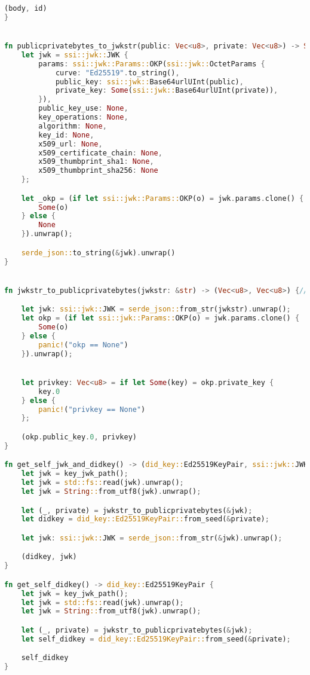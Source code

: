 \begin{lstlisting}[language=Rust]
    (body, id)
}


fn publicprivatebytes_to_jwkstr(public: Vec<u8>, private: Vec<u8>) -> String {
    let jwk = ssi::jwk::JWK {
        params: ssi::jwk::Params::OKP(ssi::jwk::OctetParams {
            curve: "Ed25519".to_string(),
            public_key: ssi::jwk::Base64urlUInt(public),
            private_key: Some(ssi::jwk::Base64urlUInt(private)),
        }),
        public_key_use: None,
        key_operations: None,
        algorithm: None,
        key_id: None,
        x509_url: None,
        x509_certificate_chain: None,
        x509_thumbprint_sha1: None,
        x509_thumbprint_sha256: None
    };

    let _okp = (if let ssi::jwk::Params::OKP(o) = jwk.params.clone() {
        Some(o)
    } else {
        None
    }).unwrap();

    serde_json::to_string(&jwk).unwrap()
}


fn jwkstr_to_publicprivatebytes(jwkstr: &str) -> (Vec<u8>, Vec<u8>) {// -> (public: Vec<u8>, private: Vec<u8>)

    let jwk: ssi::jwk::JWK = serde_json::from_str(jwkstr).unwrap();
    let okp = (if let ssi::jwk::Params::OKP(o) = jwk.params.clone() {
        Some(o)
    } else {
        panic!("okp == None")
    }).unwrap();


    let privkey: Vec<u8> = if let Some(key) = okp.private_key {
        key.0
    } else {
        panic!("privkey == None")
    };

    (okp.public_key.0, privkey)
}

fn get_self_jwk_and_didkey() -> (did_key::Ed25519KeyPair, ssi::jwk::JWK) {
    let jwk = key_jwk_path();
    let jwk = std::fs::read(jwk).unwrap();
    let jwk = String::from_utf8(jwk).unwrap();

    let (_, private) = jwkstr_to_publicprivatebytes(&jwk);
    let didkey = did_key::Ed25519KeyPair::from_seed(&private);

    let jwk: ssi::jwk::JWK = serde_json::from_str(&jwk).unwrap();

    (didkey, jwk)
}

fn get_self_didkey() -> did_key::Ed25519KeyPair {
    let jwk = key_jwk_path();
    let jwk = std::fs::read(jwk).unwrap();
    let jwk = String::from_utf8(jwk).unwrap();

    let (_, private) = jwkstr_to_publicprivatebytes(&jwk);
    let self_didkey = did_key::Ed25519KeyPair::from_seed(&private);

    self_didkey
}


\end{lstlisting}
